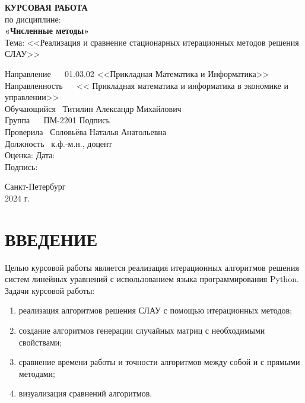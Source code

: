 \documentclass[14pt]{extarticle}
\begin{document}
\begin{titlepage}
\begin{center}
        \textbf{КУРСОВАЯ РАБОТА}\\
        по дисциплине: \\
        \textbf{«Численные методы»}\\
        \vspace*{0.5cm}
        Тема:
        <<Реализация и сравнение стационарных итерационных методов решения СЛАУ>>\\
    \end{center}
        Направление ~~ 01.03.02 <<Прикладная Математика и Информатика>>\\ 
        Направленность ~~  << Прикладная математика и информатика в экономике
        и управлении>>\\
        Обучающийся~ Титилин Александр Михайлович   \\
        Группа ~~ ПМ-2201 \hspace{6.5cm}
        Подпись  \underline{\hspace{4cm}}
        \vspace{1cm}\\
        Проверила~ Соловьёва Наталья Анатольевна\\
        Должность~ к.ф.-м.н., доцент
        \vspace{0.5cm}\\
        Оценка:\underline{\hspace{5cm}} \hspace{3cm} Дата: \underline{\hspace{3cm}}
        \vspace{0.5cm}\\
        Подпись: \underline{\hspace{3cm}}
    \begin{center}
        Санкт-Петербург\\
       2024 г.
    \end{center}
\end{titlepage}
\setcounter{page}{2}
    \tableofcontents{}
    \pagebreak{}
    \section*{ВВЕДЕНИЕ}
    Целью курсовой работы является реализация итерационных
    алгоритмов решения систем линейных уравнений с использованием
    языка программирования Python.\\
    Задачи курсовой работы:
    \begin{enumerate}
        \item реализация алгоритмов решения СЛАУ с помощью итерационных методов;
        \item создание алгоритмов генерации случайных матриц с необходимыми свойствами;
        \item сравнение времени работы и точности алгоритмов между собой и с прямыми методами;
        \item визуализация сравнений алгоритмов.
    \end{enumerate}
    \pagebreak
\end{document}
